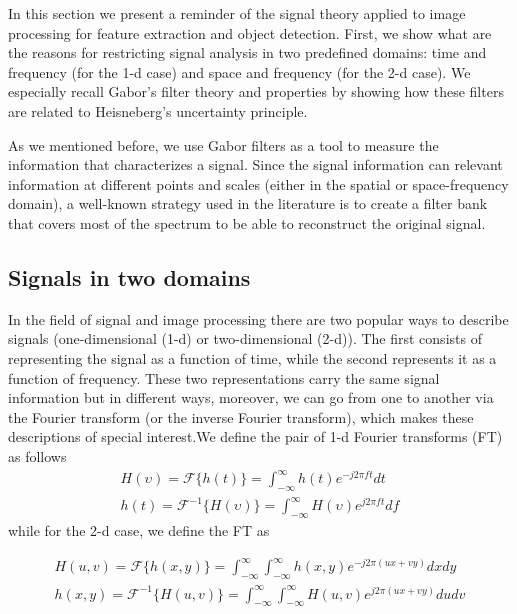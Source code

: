 In this section we present a reminder of the signal theory applied to image processing for feature extraction and object detection. First, we show what are the reasons for restricting signal analysis in two predefined domains: time and frequency (for the 1-d case) and space and frequency (for the 2-d case). We especially recall Gabor's filter theory and properties by showing how these filters are related to Heisneberg's uncertainty principle.

As we mentioned before, we use Gabor filters as a tool to measure the information that characterizes a signal. Since the signal information can relevant information at different points and scales (either in the spatial or space-frequency domain), a well-known strategy used in the literature is to create a filter bank that covers most of the spectrum to be able to reconstruct the original signal.

\subsection{Signals in two domains}
In the field of signal and image processing there are two popular ways to describe signals (one-dimensional (1-d) or two-dimensional (2-d)). The first consists of representing the signal as a function of time, while the second represents it as a function of frequency. These two representations carry the same signal information but in different ways, moreover, we can go from one to another via the Fourier transform (or the inverse Fourier transform), which makes these descriptions of special interest.We define the pair of 1-d Fourier transforms (FT) as follows
\begin{equation}\label{eq:fourier_transforms_1d}
    \begin{gathered}
        H(\upsilon) = \mathcal{F}\{h(t)\} = \int_{-\infty}^{\infty} h(t) e^{-j2\pi f t} dt \\
        h(t) = \mathcal{F}^{-1}\{H(\upsilon)\} = \int_{-\infty}^{\infty} H(\upsilon) e^{j2\pi f t} df 
    \end{gathered}
\end{equation}
while for the 2-d case, we define the FT as

\begin{equation}\label{eq:fourier_transforms_2d}
    \begin{gathered}
        H(u, v) = \mathcal{F}\{h(x, y)\} = \int_{-\infty}^{\infty} \int_{-\infty}^{\infty} h(x, y) e^{-j2\pi (ux + vy)} dx dy \\
        h(x, y) = \mathcal{F}^{-1}\{H(u, v)\} = \int_{-\infty}^{\infty} \int_{-\infty}^{\infty}  H(u, v) e^{j2\pi (ux + vy)} du dv 
    \end{gathered}
\end{equation}

